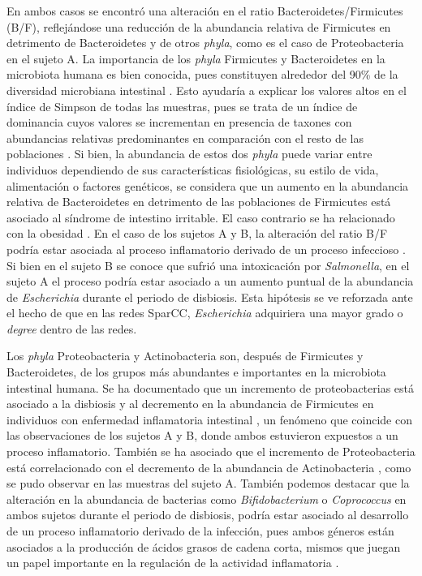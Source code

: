 \documentclass[
]{book}
\begin{document}
En ambos casos se encontró una alteración en el ratio Bacteroidetes/Firmicutes (B/F), reflejándose una reducción de la abundancia relativa de Firmicutes en detrimento de Bacteroidetes y de otros \emph{phyla}, como es el caso de Proteobacteria en el sujeto A. La importancia de los \emph{phyla} Firmicutes y Bacteroidetes en la microbiota humana es bien conocida, pues constituyen alrededor del 90\% de la diversidad microbiana intestinal \citep{magne2020firmicutes}. Esto ayudaría a explicar los valores altos en el índice de Simpson de todas las muestras, pues se trata de un índice de dominancia cuyos valores se incrementan en presencia de taxones con abundancias relativas predominantes en comparación con el resto de las poblaciones \citep{indiani2018childhood}. Si bien, la abundancia de estos dos \emph{phyla} puede variar entre individuos dependiendo de sus características fisiológicas, su estilo de vida, alimentación o factores genéticos, se considera que un aumento en la abundancia relativa de Bacteroidetes en detrimento de las poblaciones de Firmicutes está asociado al síndrome de intestino irritable. El caso contrario se ha relacionado con la obesidad \citep{magne2020firmicutes}. En el caso de los sujetos A y B, la alteración del ratio B/F podría estar asociada al proceso inflamatorio derivado de un proceso infeccioso \citep{stojanov2020influence}. Si bien en el sujeto B se conoce que sufrió una intoxicación por \emph{Salmonella}, en el sujeto A el proceso podría estar asociado a un aumento puntual de la abundancia de \emph{Escherichia} durante el periodo de disbiosis. Esta hipótesis se ve reforzada ante el hecho de que en las redes SparCC, \emph{Escherichia} adquiriera una mayor grado o \emph{degree} dentro de las redes.

Los \emph{phyla} Proteobacteria y Actinobacteria son, después de Firmicutes y Bacteroidetes, de los grupos más abundantes e importantes en la microbiota intestinal humana. Se ha documentado que un incremento de proteobacterias está asociado a la disbiosis y al decremento en la abundancia de Firmicutes en individuos con enfermedad inflamatoria intestinal \citep{magne2020firmicutes}, un fenómeno que coincide con las observaciones de los sujetos A y B, donde ambos estuvieron expuestos a un proceso inflamatorio. También se ha asociado que el incremento de Proteobacteria está correlacionado con el decremento de la abundancia de Actinobacteria \citep{stojanov2020influence}, como se pudo observar en las muestras del sujeto A. También podemos destacar que la alteración en la abundancia de bacterias como \emph{Bifidobacterium} o \emph{Coprococcus} en ambos sujetos durante el periodo de disbiosis, podría estar asociado al desarrollo de un proceso inflamatorio derivado de la infección, pues ambos géneros están asociados a la producción de ácidos grasos de cadena corta, mismos que juegan un papel importante en la regulación de la actividad inflamatoria \citep{lee2018blueberry}.
\end{document}
